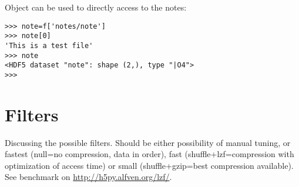 \documentclass[a4paper,12pt]{article}
\begin{document}
Object can be used to directly access to the notes:
\begin{verbatim}
>>> note=f['notes/note']
>>> note[0]
'This is a test file'
>>> note
<HDF5 dataset "note": shape (2,), type "|O4">
>>> 
\end{verbatim}

\section{Filters}
\label{sec:filters}

Discussing the possible filters. Should be either possibility of
manual tuning, or fastest (null=no compression, data in order), fast
(shuffle+lzf=compression with optimization of access time) or small
(shuffle+gzip=best compression available). See benchmark on
\url{http://h5py.alfven.org/lzf/}. 
\end{document}
